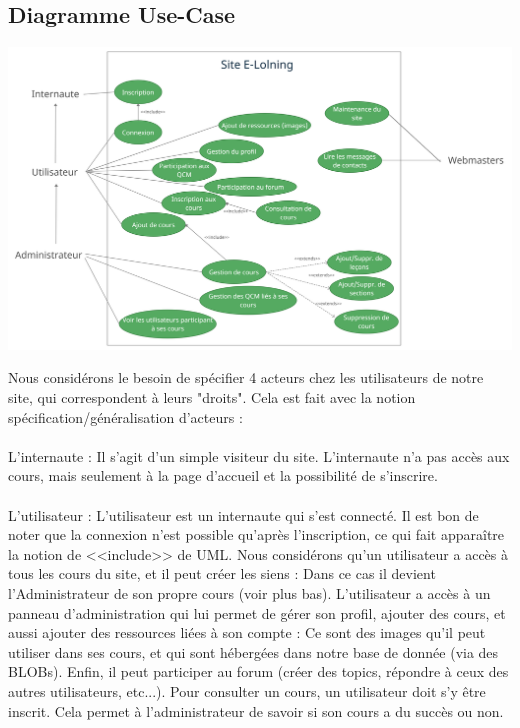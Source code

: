 \documentclass[a4paper,10pt]{article}
\begin{document}
\subsection{Diagramme Use-Case}
\centerline{
    \includegraphics[width=19cm]{images/UseCase.png}
}
Nous considérons le besoin de spécifier 4 acteurs chez les utilisateurs de notre site, qui correspondent à leurs "droits". Cela est fait avec la notion spécification/généralisation d'acteurs :\\\\

L'internaute : Il s'agit d'un simple visiteur du site. L'internaute n'a pas accès aux cours, mais seulement à la page d'accueil et la possibilité de s'inscrire.\\\\

L'utilisateur : L'utilisateur est un internaute qui s'est connecté. Il est bon de noter que la connexion n'est possible qu'après l'inscription, ce qui fait apparaître la notion de <<include>> de UML. Nous considérons qu'un utilisateur a accès à tous les cours du site, et il peut créer les siens : Dans ce cas il devient l'Administrateur de son propre cours (voir plus bas).
L'utilisateur a accès à un panneau d'administration qui lui permet de gérer son profil, ajouter des cours, et aussi ajouter des ressources liées à son compte : Ce sont des images qu'il peut utiliser dans ses cours, et qui sont hébergées dans notre base de donnée (via des BLOBs). Enfin, il peut participer au forum (créer des topics, répondre à ceux des autres utilisateurs, etc...).
Pour consulter un cours, un utilisateur doit s'y être inscrit. Cela permet à l'administrateur de savoir si son cours a du succès ou non.\\\\
\end{document}
